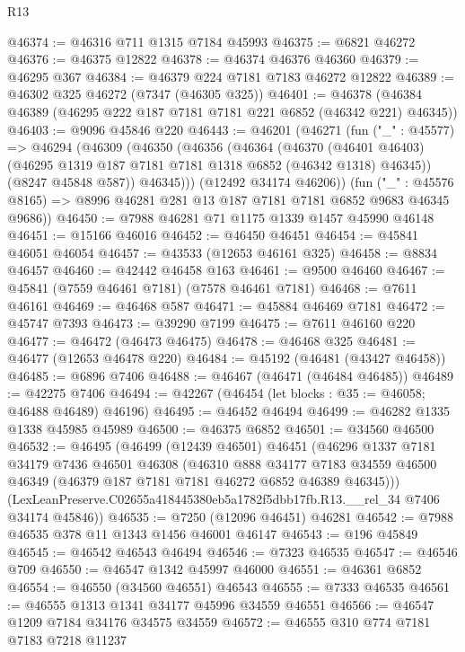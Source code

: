 \begin{lexlean}{R13}
\begin{coremodule}
@46374 := @46316 @711 @1315 @7184 @45993
@46375 := @6821 @46272
@46376 := @46375 @12822
@46378 := @46374 @46376 @46360
@46379 := @46295 @367
@46384 := @46379 @224 @7181 @7183 @46272 @12822
@46389 := @46302 @325 @46272 (@7347 (@46305 @325))
@46401 := @46378 (@46384 @46389 (@46295 @222 @187 @7181 @7181 @221 @6852 (@46342 @221) @46345))
@46403 := @9096 @45846 @220
@46443 := @46201
    (@46271
      (fun ("_" : @45577) =>
      @46294
        (@46309
          (@46350
            (@46356
              (@46364
                (@46370
                  (@46401 @46403)
                  (@46295 @1319 @187 @7181 @7181 @1318 @6852 (@46342 @1318) @46345))
                (@8247 @45848 @587))
              @46345)))
        (@12492 @34174 @46206))
      (fun ("_" : @45576 @8165) => @8996 @46281 @281 @13 @187 @7181 @7181 @6852 @9683 @46345 @9686))
@46450 := @7988 @46281 @71 @1175 @1339 @1457 @45990 @46148
@46451 := @15166 @46016
@46452 := @46450 @46451
@46454 := @45841 @46051 @46054
@46457 := @43533 (@12653 @46161 @325)
@46458 := @8834 @46457
@46460 := @42442 @46458 @163
@46461 := @9500 @46460
@46467 := @45841 (@7559 @46461 @7181) (@7578 @46461 @7181)
@46468 := @7611 @46161
@46469 := @46468 @587
@46471 := @45884 @46469 @7181
@46472 := @45747 @7393
@46473 := @39290 @7199
@46475 := @7611 @46160 @220
@46477 := @46472 (@46473 @46475)
@46478 := @46468 @325
@46481 := @46477 (@12653 @46478 @220)
@46484 := @45192 (@46481 (@43427 @46458))
@46485 := @6896 @7406
@46488 := @46467 (@46471 (@46484 @46485))
@46489 := @42275 @7406
@46494 := @42267 (@46454 (let blocks : @35 := @46058; @46488 @46489) @46196)
@46495 := @46452 @46494
@46499 := @46282 @1335 @1338 @45985 @45989
@46500 := @46375 @6852
@46501 := @34560 @46500
@46532 := @46495
    (@46499
      (@12439 @46501)
      @46451
      (@46296
        @1337
        @7181
        @34179
        @7436
        @46501
        @46308
        (@46310
          @888
          @34177
          @7183
          @34559
          @46500
          @46349
          (@46379 @187 @7181 @7181 @46272 @6852 @46389 @46345)))
      (LexLeanPreserve.C02655a418445380eb5a1782f5dbb17fb.R13.__rel_34 @7406 @34174 @45846))
@46535 := @7250 (@12096 @46451) @46281
@46542 := @7988 @46535 @378 @11 @1343 @1456 @46001 @46147
@46543 := @196 @45849
@46545 := @46542 @46543 @46494
@46546 := @7323 @46535
@46547 := @46546 @709
@46550 := @46547 @1342 @45997 @46000
@46551 := @46361 @6852
@46554 := @46550 (@34560 @46551) @46543
@46555 := @7333 @46535
@46561 := @46555 @1313 @1341 @34177 @45996 @34559 @46551
@46566 := @46547 @1209 @7184 @34176 @34575 @34559
@46572 := @46555 @310 @774 @7181 @7183 @7218 @11237

\end{coremodule}
\end{lexlean}
